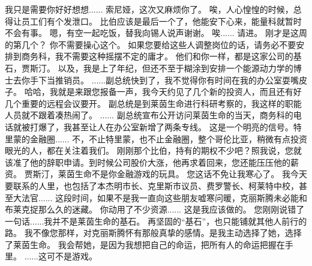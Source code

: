 \documentclass[openany]{book}
\begin{document}
\begin{dialogue}
     我只是需要你好好想想......
     索尼娅，这次又麻烦你了。
     唉，人心惶惶的时候，总得让员工们有个发泄口。
     比伯应该是最后一个了，他能安下心来，能量科就暂时不会有事。
     嗯，有空一起吃饭，替我向锡人说声谢谢。
     唉......
     请进。
     刚才是这周的第几个？
     你不需要操心这个。
     如果您要给这些人调整岗位的话，请务必不要安排到商务科，我不需要这种摇摆不定的庸才。
     他们和你一样，都是这家公司的基石，贾斯汀。
     以及，我是上了年纪，但还不至于糊涂到安排一个能源动力学的博士去你手下当推销员。
     ......副总统快到了，我不觉得你有时间在我的办公室耍嘴皮子。
     哈哈，我就是来跟您报备一声，我今天约见了几个新的投资人，而且还有好几个重要的远程会议要开。
     副总统是到莱茵生命进行科研考察的，我这样的职能人员就不跟着凑热闹了。
     ......
     副总统宣布公开访问莱茵生命的当天，商务科的电话就被打爆了，我甚至让人在办公室新增了两条专线。
     这是一个明亮的信号。特里蒙的金融圈......
     不，不止特里蒙，也不止金融圈，整个哥伦比亚，稍微有点投资眼光的人，都在关注着我们。
     刚刚那个比伯，持有的期权不少吧？照我说，您就该准了他的辞职申请。到时候公司股价大涨，他再求着回来，您还能压压他的薪资。
     贾斯汀，莱茵生命不是你金融游戏的玩具。
     您这话不免让我寒心了。
     我今天要联系的人里，也包括了本杰明市长、克里斯市议员、费罗警长、柯莱特中校，甚至大法官......
     这段时间，如果不是我一直向这些朋友嘘寒问暖，克丽斯腾未必能和布莱克捉那么久的迷藏。
     你动用了不少资源......
     这是我应该做的。
     您刚刚说错了一句话......我并不是莱茵生命的基石。
     再坚固的“基石”，也只能铺就其他人前行的路。
     我不像您那样，对克丽斯腾怀有那般真挚的感情。是我主动选择了她，选择了莱茵生命。
     我会帮她，是因为我想把自己的命运，把所有人的命运把握在手里。
     ......这可不是游戏。
\end{dialogue}
\end{document}
